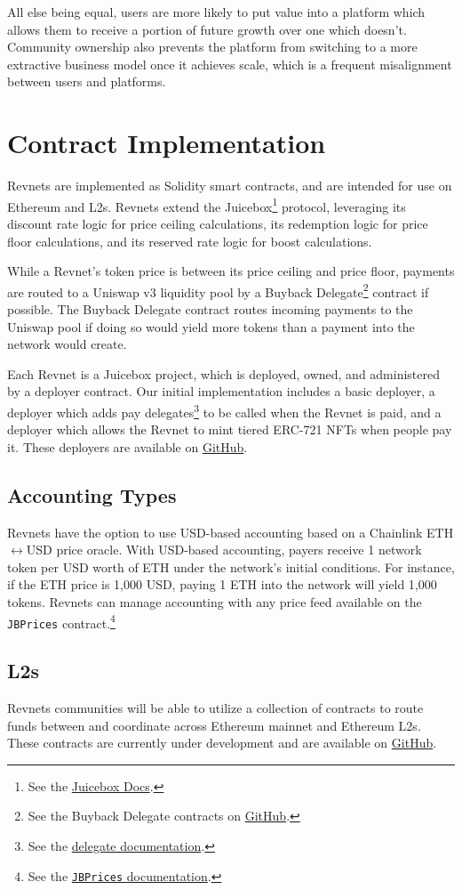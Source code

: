 \documentclass{article}
\begin{document}
All else being equal, users are more likely to put value into a platform which allows them to receive a portion of future growth over one which doesn't. Community ownership also prevents the platform from switching to a more extractive business model once it achieves scale, which is a frequent misalignment between users and platforms.

\section{Contract Implementation}

Revnets are implemented as Solidity smart contracts, and are intended for use on Ethereum and L2s. Revnets extend the Juicebox\footnote{See the \href{https://docs.juicebox.money}{Juicebox Docs}.} protocol, leveraging its discount rate logic for price ceiling calculations, its redemption logic for price floor calculations, and its reserved rate logic for boost calculations.

While a Revnet's token price is between its price ceiling and price floor, payments are routed to a Uniswap v3 liquidity pool by a Buyback Delegate\footnote{See the Buyback Delegate contracts on \href{https://github.com/jbx-protocol/juice-buyback}{GitHub}.} contract if possible. The Buyback Delegate contract routes incoming payments to the Uniswap pool if doing so would yield more tokens than a payment into the network would create.

Each Revnet is a Juicebox project, which is deployed, owned, and administered by a deployer contract. Our initial implementation includes a basic deployer, a deployer which adds pay delegates\footnote{See the \href{https://docs.juicebox.money/dev/learn/glossary/delegate/}{delegate documentation}.} to be called when the Revnet is paid, and a deployer which allows the Revnet to mint tiered ERC-721 NFTs when people pay it. These deployers are available on \href{https://github.com/mejango/retailism-templates}{GitHub}.

\subsection{Accounting Types}\label{sec:accounting_types}

Revnets have the option to use USD-based accounting based on a Chainlink ETH$\leftrightarrow$USD price oracle. With USD-based accounting, payers receive 1 network token per USD worth of ETH under the network's initial conditions. For instance, if the ETH price is 1,000 USD, paying 1 ETH into the network will yield 1,000 tokens. Revnets can manage accounting with any price feed available on the \texttt{JBPrices} contract.\footnote{See the \href{https://docs.juicebox.money/dev/api/contracts/jbprices/}{\texttt{JBPrices} documentation}.}

\subsection{L2s}

Revnets communities will be able to utilize a collection of contracts to route funds between and coordinate across Ethereum mainnet and Ethereum L2s. These contracts are currently under development and are available on \href{https://github.com/Bananapus}{GitHub}.
\end{document}
